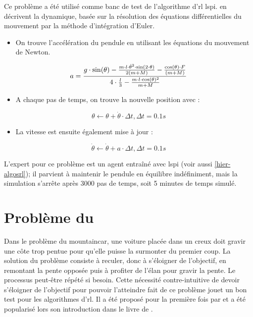 \documentclass[frenchb,a4paper,justified,notoc]{tufte-book}
\begin{document}
Ce problème a été utilisé comme banc de test de l'algorithme d'\gls{rl} \gls{lspi}. \citet{lagoudakis2003least} en décrivent la dynamique, basée sur la résolution des équations différentielles du mouvement par la méthode d'intégration d'Euler.
\begin{itemize}
\item On trouve l'accélération du pendule en utilisant les équations du mouvement de Newton.
\end{itemize}
\begin{equation}
a = {g\cdot \sin(\theta) -{m\cdot l\cdot\dot{\theta}^2\cdot\sin(2\cdot\theta)\over 2(m+M)} - 
                    {\cos(\theta)\cdot F\over (m+M)} \over {4\cdot {l\over 3} - {m\cdot l\cdot\cos(\theta)^2\over m+M}}}
\end{equation}
\begin{itemize}
\item A chaque pas de temps, on trouve la nouvelle position avec :
\end{itemize}
\begin{equation}
\theta \leftarrow \theta + \dot{\theta}\cdot \Delta t, \Delta t = 0.1 s
\end{equation}
\begin{itemize}
\item La vitesse est ensuite également mise à jour :
\end{itemize}
\begin{equation}
\dot{\theta} \leftarrow \dot{\theta} + a \cdot \Delta t, \Delta t = 0.1s
\end{equation}

L'expert pour ce problème est un agent entraîné avec \gls{lspi} (voir aussi \autoref{hier-algosrl}); il parvient à maintenir le pendule en équilibre indéfiniment, mais la simulation s'arrête après $3000$ pas de temps, soit 5 minutes de temps simulé.
\section{Problème du }
\label{sec-9-2}
\label{hier-mountaincar}


Dans le problème du \gls{mountaincar}, une voiture placée dans un creux doit gravir une côte trop pentue pour qu'elle puisse la surmonter du premier coup. La solution du problème consiste à reculer, donc à s'éloigner de l'objectif, en remontant la pente opposée puis à profiter de l'élan pour gravir la pente. Le processus peut-être répété si besoin. Cette nécessité contre-intuitive de devoir s'éloigner de l'objectif pour pouvoir l'atteindre fait de ce problème jouet un bon test pour les algorithmes d'\gls{rl}. Il a été proposé pour la première fois par \citet{moore1990efficient} et a été popularisé lors son introduction dans le livre de \citet{sutton1998reinforcement}.
\end{document}
